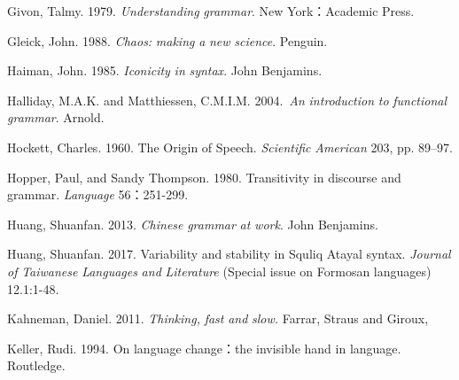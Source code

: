 \begin{stylereferences}
Givon, Talmy. 1979. \textit{Understanding} \textit{grammar}. New York：Academic Press.
\end{stylereferences}

\begin{stylereferences}
Gleick, John. 1988. \textit{Chaos:} \textit{making} \textit{a} \textit{new} \textit{science}. Penguin.
\end{stylereferences}

\begin{stylereferences}
Haiman, John. 1985. \textit{Iconicity} \textit{in} \textit{syntax}. John Benjamins.
\end{stylereferences}

\begin{stylereferences}
Halliday, M.A.K. and Matthiessen, C.M.I.M. 2004.~\textit{An} \textit{introduction} \textit{to} \textit{functional} \textit{grammar}.  Arnold.
\end{stylereferences}

\begin{stylereferences}
Hockett, Charles. 1960. The Origin of Speech. \textit{Scientific} \textit{American} 203, pp. 89–97.
\end{stylereferences}

\begin{stylereferences}
Hopper, Paul, and Sandy Thompson. 1980. Transitivity in discourse and grammar. \textit{Language} 56：251-299.
\end{stylereferences}

\begin{stylereferences}
Huang, Shuanfan. 2013. \textit{Chinese} \textit{grammar} \textit{at} \textit{work}. John Benjamins.
\end{stylereferences}

\begin{stylereferences}
Huang, Shuanfan. 2017. Variability and stability in Squliq Atayal syntax. \textit{Journal} \textit{of} \textit{Taiwanese} \textit{Languages} \textit{and} \textit{Literature} (Special issue on Formosan languages) 12.1:1-48.
\end{stylereferences}

\begin{stylereferences}
Kahneman, Daniel. 2011. \textit{Thinking,} \textit{fast} \textit{and} \textit{slow.} Farrar, Straus and Giroux, 
\end{stylereferences}

\begin{stylereferences}
Keller, Rudi. 1994. On language change：the invisible hand in language. Routledge. 
\end{stylereferences}


